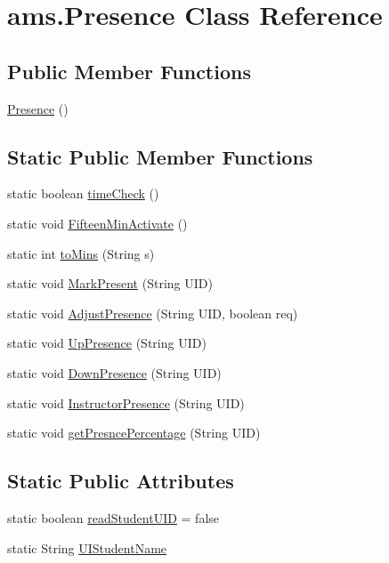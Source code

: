 \hypertarget{classams_1_1_presence}{}\section{ams.\+Presence Class Reference}
\label{classams_1_1_presence}
\subsection*{Public Member Functions}
\begin{DoxyCompactItemize}
\item 
\mbox{\hyperlink{classams_1_1_presence_a88d6cd256a57c95640b53a5bd221fac7}{Presence}} ()
\end{DoxyCompactItemize}
\subsection*{Static Public Member Functions}
\begin{DoxyCompactItemize}
\item 
static boolean \mbox{\hyperlink{classams_1_1_presence_af021bed37055300b60e76853f4bc0666}{time\+Check}} ()
\item 
static void \mbox{\hyperlink{classams_1_1_presence_a84efc9c047a0a2259f61cf55356c9701}{Fifteen\+Min\+Activate}} ()
\item 
static int \mbox{\hyperlink{classams_1_1_presence_ac7407509b71e22e2ca2fde9d52681b73}{to\+Mins}} (String s)
\item 
static void \mbox{\hyperlink{classams_1_1_presence_a6f7a875d8decb48536c8eb9a6ef8d3d2}{Mark\+Present}} (String U\+ID)
\item 
static void \mbox{\hyperlink{classams_1_1_presence_aa72c8cdcdfbec64c43fa32b469b9e822}{Adjust\+Presence}} (String U\+ID, boolean req)
\item 
static void \mbox{\hyperlink{classams_1_1_presence_af23602b98a9a3003ff240fd5cd133378}{Up\+Presence}} (String U\+ID)
\item 
static void \mbox{\hyperlink{classams_1_1_presence_a1b05700a39e8cadcba0c749d296a04f8}{Down\+Presence}} (String U\+ID)
\item 
static void \mbox{\hyperlink{classams_1_1_presence_a1ffc74f2f36c4c792834abcc5e2c28ea}{Instructor\+Presence}} (String U\+ID)
\item 
static void \mbox{\hyperlink{classams_1_1_presence_af8a73a088625da3be87b17190563fd81}{get\+Presnce\+Percentage}} (String U\+ID)
\end{DoxyCompactItemize}
\subsection*{Static Public Attributes}
\begin{DoxyCompactItemize}
\item 
static boolean \mbox{\hyperlink{classams_1_1_presence_a2f2f0c375628ca573e40201cfc514e17}{read\+Student\+U\+ID}} = false
\item 
static String \mbox{\hyperlink{classams_1_1_presence_a7facdc9c46e28bbeafd2b6208b3de6b0}{U\+I\+Student\+Name}}
\end{DoxyCompactItemize}


